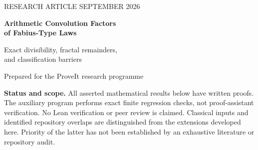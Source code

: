 \documentclass[11pt,a4paper]{article}
\theoremstyle{definition}
\theoremstyle{remark}
\newcommand{\D}{\mathsf D}
\begin{document}
\hypersetup{pageanchor=false}
\begin{titlepage}
\vspace*{12mm}
\begin{center}
{\small RESEARCH ARTICLE \quad\textbar{} SEPTEMBER 2026}\par
\vspace{13mm}
{\LARGE\bfseries Arithmetic Convolution Factors\\[5pt]
of Fabius-Type Laws}\par
\vspace{8mm}
{\large Exact divisibility, fractal remainders,\\[3pt]
and classification barriers}\par
\vspace{12mm}
{\normalsize Prepared for the ProveIt research programme}
\end{center}
\vspace{9mm}
\begin{abstract}
Let $A_0=1$ and let $A_k$ be a strictly increasing chain of positive
integers under divisibility. The random series
$X_A=\sum_{k\ge0}U_k/A_k$, with independent centered unit uniforms $U_k$,
has a compactly supported $C^\infty$ density. We give an exact classification
of factorizations $\mu_A=\D_c\mu_B*\nu$ by probability measures:
they exist precisely when $c=1/m$ for a positive integer $m$ and
$A_k\mid mB_k$ for every $k$. The unique remainder has an explicit
independent-digit representation. This converts a positive-definiteness
problem for entire Fourier quotients into coordinatewise arithmetic.

The classification yields a rigid cross-base theorem for geometric-uniform
laws, an embedding of inclusion modulo finite sets into scaled convolution
factorability, and a compact family of smooth convolution divisors of the single
Rvachev law on which mutual factorability has no Borel real-valued complete
invariant. With
primitive-recursive ladder presentations, fixed-scale factorability is
$\Pi^0_1$-complete and existence of some scale is $\Sigma^0_2$-complete.
Explicit spline approximation bounds show that these barriers persist for
uniformly computable smooth densities. For same-base geometric laws we
also classify the remainder as singular continuous, a finite uniform
spline, or a finite smoothing of a singular measure; we prove sharp
integer regularity, sharp power Fourier decay, and a sharp H\"older result
in the separated-digit case. Further questions isolate the boundaries
of the classification rather than presuming that they are already solved.
\end{abstract}
\vfill
\noindent\textbf{Status and scope.}
All asserted mathematical results below have written proofs. The auxiliary
program performs exact finite regression checks, not proof-assistant
verification. No Lean verification or peer review is claimed. Classical
inputs and identified repository overlaps are distinguished from the
extensions developed here. Priority of the latter has not been established
by an exhaustive literature or repository audit.
\end{titlepage}
\end{document}
